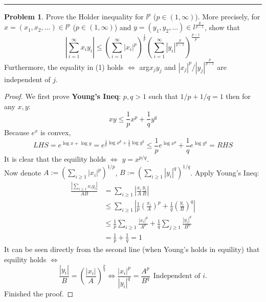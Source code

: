 \documentclass[a4paper, 10pt]{article}
\theoremstyle{definition}
\newtheorem{problem}{Problem}
\theoremstyle{hSol}
\begin{document}
\noindent\rule{16cm}{0.4pt}
\begin{problem} Prove the Holder inequality for $l^p$ ($p\in(1,\infty)$). More precisely, for $x=(x_1, x_2, ...)\in l^p$ ($p\in(1,\infty)$) and $y=(y_1, y_2, ...)\in l^{\frac{p}{p-1}}$, show that
$$\left|\sum_{i=1}^{\infty}x_i y_i\right| \leq \left(\sum_{i=1}^{\infty}|x_i|^p\right)^{\frac{1}{p}}\left(\sum_{i=1}^{\infty}|y_i|^{\frac{p}{p-1}}\right)^{\frac{p-1}{p}}$$
Furthermore, the equality in (1) holds $\iff$ arg$x_j y_j$ and $|x_j|^p/|y_j|^{\frac{p}{p-1}}$ are independent of $j$. 
\end{problem}
\begin{proof} We first prove \textbf{Young's Ineq}: $p,q>1$ such that $1/p+1/q=1$ then for any $x,y$:
\begin{equation}
  xy \leq \frac{1}{p}x^p + \frac{1}{q} y^q
\end{equation}
Because $e^x$ is convex,
\begin{equation}
  LHS = e^{\log x + \log y} = e^{\frac{1}{p}\log x^p + \frac{1}{q}\log y^q} \leq \frac{1}{p}e^{\log x^p} + \frac{1}{q}e^{\log y^q} = RHS
\end{equation}
It is clear that the equility holds $\iff$ $y=x^{p/q}$.\\
Now denote $A:=(\sum_{i\geq 1}|x_i|^p)^{1/p}$, $B:=(\sum_{i\geq 1}|y_i|^q)^{1/q}$. Apply Young's Ineq:
\begin{equation}
  \begin{split}
    \frac{|\sum_{i\geq 1} x_iy_i|}{AB} &= \sum_{i\geq 1}\left|\frac{x_i}{A} \frac{y_i}{B}\right|  \\
    &\leq \sum_{i\geq 1}\left|\frac{1}{p}\left(\frac{x_i}{A}\right)^p+\frac{1}{q}\left(\frac{y_i}{B}\right)^q\right| \\
    &\leq \frac{1}{p}\sum_{i\geq 1}\frac{|x_i|^p}{A^p} + \frac{1}{q}\sum_{j\geq 1}\frac{|y_i|^q}{B^q}\\
    &= \frac{1}{p}+\frac{1}{q} = 1
  \end{split}
\end{equation}
It can be seen directly from the second line (when Young's holds in equility) that equility holds $\iff$
\begin{equation}
  \frac{|y_i|}{B}  = \left(\frac{|x_i|}{A}\right)^{\frac{p}{q}} \iff \frac{|x_i|^p}{|y_i|^q}  = \frac{A^p}{B^q}~~\text{Independent of $i$}.
\end{equation}
Finished the proof.
\end{proof} 
\end{document}
